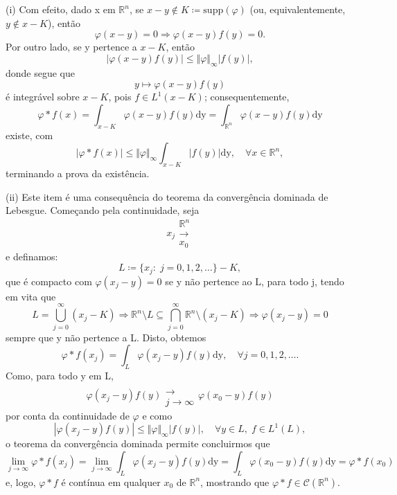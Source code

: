 \documentclass[../distribution_theory_notes.tex]{subfiles}
\begin{document}
\begin{proof*}
  (i) Com efeito, dado x em \(\mathbb{R}^{n}\), se \(x-y\nin K\coloneqq \mathrm{supp}(\varphi )\) (ou, equivalentemente, \(y\not\in x-K\)), então 
    \[
      \varphi (x-y)=0 \Rightarrow \varphi (x-y)f(y)=0.
    \]
    Por outro lado, se y pertence a \(x-K\), então 
      \[
        |\varphi(x-y) f(y) | \leq \Vert \varphi  \Vert_{\infty} |f(y)|,
      \]
      donde segue que 
        \[
          y\mapsto \varphi (x-y)f(y)
        \]
        é integrável sobre \(x-K\), pois \(f\in L^{1}(x-K)\); consequentemente, 
          \[
            \varphi *f(x)=\int_{x-K}^{}\varphi (x-y)f(y) \mathrm{dy}=\int_{\mathbb{R}^{n}}^{}\varphi (x-y)f(y) \mathrm{dy}
          \]
          existe, com 
            \[
              |\varphi *f(x)|\leq \Vert \varphi  \Vert_{\infty} \int_{x-K}^{}|f(y)| \mathrm{dy},\quad \forall x\in \mathbb{R}^{n},
            \]
            terminando a prova da existência.

            (ii) Este item é uma consequência do teorema da convergência dominada de Lebesgue. Começando pela continuidade, seja 
            \[
            x_{j}\substack{\mathbb{R}^{n} \\ \longrightarrow \\ x_{0}}
            \]
            e definamos: 
              \[
                L\coloneqq \{x_{j}:\; j=0,1,2,\dotsc \}-K,
              \]
              que é compacto com \(\varphi (x_{j}-y)=0\) se y não pertence ao L, para todo j, tendo em vita que 
                \[
                  L=\bigcup_{j=0}^{\infty}(x_{j}-K)\Rightarrow \mathbb{R}^{n}\setminus{L}\subseteq \bigcap_{j=0}^{\infty}\mathbb{R}^{n}\setminus{(x_{j}-K)}\Rightarrow \varphi (x_{j}-y)=0
                \]
                sempre que y não pertence a L. Disto, obtemos 
                  \[
                    \varphi *f(x_{j})=\int_{L}^{}\varphi (x_{j}-y)f(y) \mathrm{dy},\quad \forall j=0,1,2,\dotsc .
                  \]
                  Como, para todo y em L, 
                    \[
                      \varphi (x_{j}-y)f(y)\substack{ \\ \longrightarrow \\ j\to\infty}\varphi (x_{0}-y)f(y)
                    \]
                    por conta da continuidade de \(\varphi \) e como 
                      \[
                        |\varphi (x_{j}-y)f(y)|\leq \Vert \varphi  \Vert_{\infty}|f(y)|,\quad \forall y\in L,\; f\in L^{1}(L),
                      \]
                      o teorema da convergência dominada permite concluirmos que 
                        \[
                          \lim_{j\to \infty}\varphi *f(x_{j})=\lim_{j\to \infty}\int_{L}^{}\varphi (x_{j}-y)f(y) \mathrm{dy}=\int_{L}^{}\varphi (x_{0}-y)f(y) \mathrm{dy}=\varphi *f(x_{0})
                        \]
                        e, logo, \(\varphi *f\) é contínua em qualquer \(x_{0}\) de \(\mathbb{R}^{n}\), mostrando que \(\varphi *f\in \mathcal{C}(\mathbb{R}^{n})\). 


\end{proof*}
\end{document}

